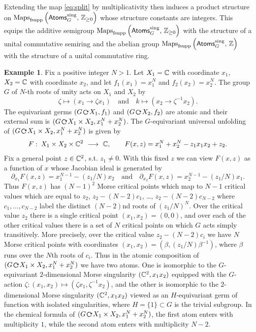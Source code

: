 \documentclass[twoside,leqno]{article}
\numberwithin{equation}{section}
\theoremstyle{plain}
\theoremstyle{definition}
\newtheorem{example}[equation]{Example}
\begin{document}
\medskip

Extending the map \eqref{eq:split} by multiplicativity then induces a  product structure
on \linebreak 
$\operatorname{Maps}_{\operatorname{fsupp}}\left( \mathsf{Atoms}_{G}^{\operatorname{sing}}, \, \mathbb Z_{\geq 0} 
\right)$  whose structure constants are integers. This equips the additive semigroup 
$\operatorname{Maps}_{\operatorname{fsupp}}\left( \mathsf{Atoms}_{G}^{\operatorname{sing}}, \, \mathbb Z_{\geq 0} 
\right)$ with the structure of a unital commutative semiring and the abelian group 
$\operatorname{Maps}_{\operatorname{fsupp}}\left( \mathsf{Atoms}_{G}^{\operatorname{sing}}, \, \mathbb Z 
\right)$ with the structure of a unital commutative ring.


\begin{example} \label{ex:TS} Fix a positive integer $N > 1$.
Let $X_{1} = \mathbb C$ with coordinate $x_{1}$, $X_{2} = \mathbb C$ with coordinate $x_{2}$, and
let $f_{1}(x_{1}) = x_{1}^{N}$ and $f_{2}(x_{2}) = x_{2}^{N}$. The group $G$ of $N$-th roots of unity acts on $X_{1}$ and $X_{2}$ by 
\[
\zeta \mapsto (x_{1}\to \zeta x_{1}) \quad \text{and}  \quad k \mapsto (x_{2}\to \zeta^{-1}x_{2}).
\]
The equivariant germs $(G\, \actleft\, X_{1},f_{1})$ and $(G\, \actleft\, X_{2},f_{2})$ are atomic and their external sum is 
$(G\, \actleft\, X_{1}\times X_{2},x_{1}^{N} + x_{2}^{N})$. The $G$-equivariant universal unfolding of $(G\, \actleft\, X_{1}\times X_{2},x_{1}^{N} + x_{2}^{N})$ is given by 
\[
F \, \colon \, X_{1}\times X_{2} \times \bbC^2 \ \longrightarrow \ \bbC, \qquad F(x,z) = x_{1}^{N} + x_{2}^{N} - z_{1}x_{1}x_{2} + z_{2}.
\]
Fix a general point $z\in \mathbb C^2$, s.t. $z_{1} \neq 0$. With this fixed $z$ we can view $F(x,z)$ as a function of $x$ whose Jacobian ideal is generated by 
\[
\partial_{x_{1}}F(x,z) = x_{1}^{N-1} - (z_{1}/N) x_{2} \quad  \text{and} 
\quad 
\partial_{x_{2}}F(x,z) = x_{2}^{N-1} - (z_{1}/N) x_{1}.
\]
Thus 
$F(x,z)$ has $(N-1)^2$ Morse critical points which map to $N-1$ critical values which are equal to $z_{2}$, $z_{2} - (N-2)c_{1}$, \ldots, $z_{2} - (N-2)c_{N-2}$ where $c_{1}, \ldots, c_{N-2}$ label the distinct $(N-2)$nd roots of $(z_{1}/N)^{N}$. 
Over the critical value $z_{2}$ there is a single critical point $(x_{1},x_{2}) = (0,0)$, and over each of the other critical values there is a set of $N$ critical points on which $G$ acts simply transitively. 
More precisely, over the critical value $z_{2} - (N-2)c_{i}$ we have $N$ Morse critical points with coordinates 
$(x_{1},x_{2}) = (\beta,(z_{1}/N)\beta^{-1})$, where $\beta$ runs over the $N$th roots of $c_{i}$.
Thus in the atomic composition of $(G\, \actleft\, X_{1}\times X_{2},x_{1}^{N} + x_{2}^{N})$ we have two atoms. One is isomorphic to the $G$-equivariant $2$-dimensional Morse singularity $(\mathbb C^2,x_{1}x_{2})$ equipped with the $G$-action $\zeta \colon (x_{1},x_{2}) \mapsto (\zeta x_{1},\zeta^{-1} x_{2})$, and the other  is isomorphic to the $2$-dimensional Morse singularity $(\mathbb C^2,x_{1}x_{2})$ viewed as an $H$-equivariant germ of function with isolated singularities, where $H = \{1\} \subset G$ is the trivial subgroup. In the chemical formula of $(G\, \actleft\, X_{1}\times X_{2},x_{1}^{N} + x_{2}^{N})$, the first atom enters with multiplicity $1$, while the second atom enters with multiplicity $N-2$.
\end{example}
\end{document}
